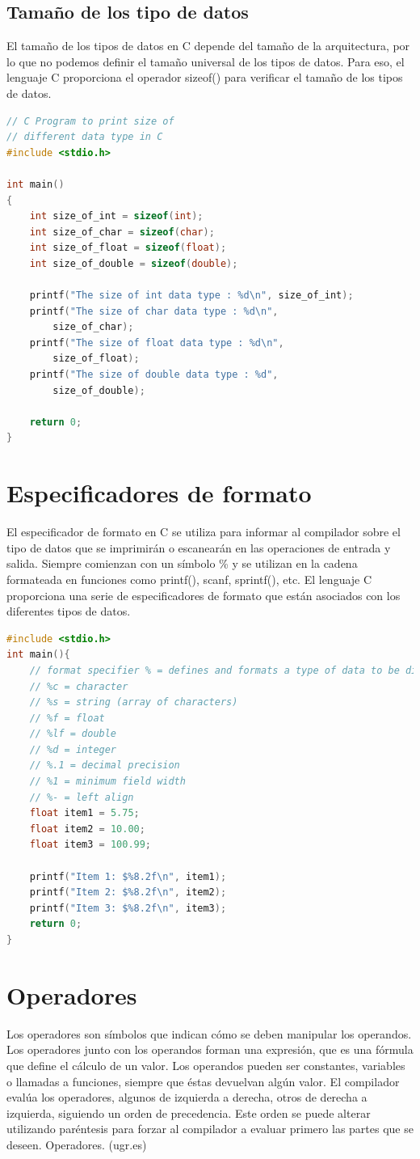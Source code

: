 \documentclass{article}
\begin{document}
\subsection{Tamaño de los tipo de datos}
El tamaño de los tipos de datos en C depende del tamaño de la arquitectura, por lo que no podemos definir el tamaño universal de los tipos de datos. Para eso, el lenguaje C proporciona el operador sizeof() para verificar el tamaño de los tipos de datos.

\begin{lstlisting}[style=mystyle, language=C]
// C Program to print size of
// different data type in C
#include <stdio.h>

int main()
{
	int size_of_int = sizeof(int);
	int size_of_char = sizeof(char);
	int size_of_float = sizeof(float);
	int size_of_double = sizeof(double);

	printf("The size of int data type : %d\n", size_of_int);
	printf("The size of char data type : %d\n",
		size_of_char);
	printf("The size of float data type : %d\n",
		size_of_float);
	printf("The size of double data type : %d",
		size_of_double);

	return 0;
}
\end{lstlisting}
\section{Especificadores de formato}
El especificador de formato en C se utiliza para informar al compilador sobre el tipo de datos que se imprimirán o escanearán en las operaciones de entrada y salida. Siempre comienzan con un símbolo \% y se utilizan en la cadena formateada en funciones como printf(), scanf, sprintf(), etc. El lenguaje C proporciona una serie de especificadores de formato que están asociados con los diferentes tipos de datos.
\begin{lstlisting}[style=mystyle, language=C]
#include <stdio.h>
int main(){
	// format specifier % = defines and formats a type of data to be displayed
	// %c = character
	// %s = string (array of characters)
	// %f = float
	// %lf = double
	// %d = integer
	// %.1 = decimal precision
	// %1 = minimum field width
	// %- = left align
	float item1 = 5.75;
	float item2 = 10.00;
	float item3 = 100.99;
	
	printf("Item 1: $%8.2f\n", item1);
	printf("Item 2: $%8.2f\n", item2);
	printf("Item 3: $%8.2f\n", item3);
	return 0;
}
\end{lstlisting}

\section{Operadores}
Los operadores son símbolos que indican cómo se deben manipular los operandos. Los operadores junto con los operandos forman una expresión, que es una fórmula que define el cálculo de un valor. Los operandos pueden ser constantes, variables o llamadas a funciones, siempre que éstas devuelvan algún valor. El compilador evalúa los operadores, algunos de izquierda a derecha, otros de derecha a izquierda, siguiendo un orden de precedencia. Este orden se puede alterar utilizando paréntesis para forzar al compilador a evaluar primero las partes que se deseen. Operadores. (ugr.es)
\end{document}
